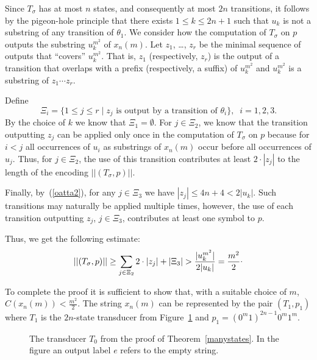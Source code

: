 \documentclass[copyright]{eptcs}
\begin{document}
Since $T_{\sigma}$ has at most $n$ states, and consequently at most $2n$
transitions, it follows by the
pigeon-hole principle that there exists $1 \leq k \leq 2n+1$ such that
$u_k$ is not a substring of any transition of $\theta_1$.
We consider how the computation
of $T_{\sigma}$ on $p$ outputs the substring $u_k^{m^2}$ of
$x_n(m)$. Let $z_1$, \ldots, $z_r$ be the minimal sequence of
outputs that ``covers'' $u_k^{m^2}$. That is, $z_1$ 
(respectively, $z_r$) is the output of a transition that
overlaps with a prefix (respectively, a suffix) of $u_k^{m^2}$
and $u_k^{m^2}$ is a substring of $z_1 \cdots z_r$. 


Define 
$$\Xi_i = \{ 1 \leq j \leq r \mid
z_j \mbox{ is output by a transition of } \theta_i \}, \;\; i =1,2,3.
$$
By the choice of $k$ we know that $\Xi_1 = \emptyset$.
For $j \in \Xi_2$, we know that the transition outputting
$z_j$ can be applied only once in the computation of
$T_{\sigma}$ on $p$ because for $i < j$ all occurrences
of  $u_i$ as substrings of $x_n(m)$ occur before all occurrences of $u_j$. 
Thus, for $j \in \Xi_2$, the use of this transition contributes
at least $2 \cdot |z_j|$ to the length of the encoding
$||(T_{\sigma},p)||$.

Finally, by~(\ref{oatta2}),
for any $j \in \Xi_3$ we have $|z_j| \leq 4n+4 < 2|u_k|$.
Such transitions may naturally be applied multiple times, however,
the use of each transition outputting $z_j$, $j \in \Xi_3$, contributes
at least one symbol to $p$. 

Thus, we get the following estimate:
$$
||(T_{\sigma}, p)|| \geq \sum_{j \in \Xi_2} 2 \cdot |z_j|
+ |\Xi_3| > \frac{|u_k^{m^2}|}{2|u_k|} = \frac{m^2}{2} \raisebox{0.5ex}{.}
$$

To complete the proof it is sufficient to
show that, with a suitable choice of $m$, 
$C(x_n(m)) < \frac{m^2}{2}$.
The string $x_n(m)$ can be represented by the pair
$(T_1, p_1)$ where $T_1$ is the $2n$-state transducer
from Figure~\ref{museol} and $p_1 = (0^m1)^{2n-1}0^m1^m$.

\begin{figure}[ht]
\hspace*{\fill}
\epsfxsize=14cm
\hspace*{\fill}
\caption{
\label{museol}
The transducer $T_0$ from the proof of Theorem~\ref{manystates}.
In the figure an output label $e$ refers to the empty
string.}
\end{figure}
\fi
\vspace*{1.5cm}
\end{document}

